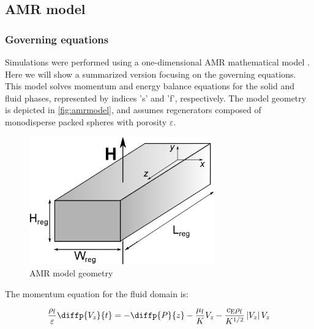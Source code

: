 \documentclass[referee]{svjour3}
\begin{document}
\subsection{AMR model}
\label{sec:amr-model}

\subsubsection{Governing equations}
\label{sec:governing-equations}

Simulations were performed using a one-dimensional AMR mathematical model \cite{bib:asme-mce,bib:trevizoli16_perfor_model}. Here we will show a summarized version focusing on the governing equations. This model solves momentum and energy balance equations for the solid and fluid phases, represented by indices 's' and 'f', respectively. The model geometry is depicted in \autoref{fig:amrmodel}, and assumes regenerators composed of monodisperse packed spheres with porosity $\varepsilon$.


\begin{figure}[!ht]
  \centering
  \includegraphics[width=8cm]{reg3d}
  \caption{AMR model geometry}
  \label{fig:amrmodel}
\end{figure}

The momentum equation for the fluid domain is:

\begin{equation}
\label{eq:75}
  \frac{\rho\ped{f}}{\varepsilon} \diffp{V_z}{t}= -\diffp{P}{z} - \frac{\mu\ped{f}}{K} V_z - \frac{c\ped{E} \rho\ped{f}}{K^{1/2}} \left| V_z\right| V_z 
\end{equation}

\end{document}
